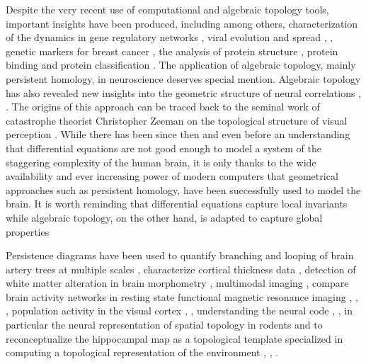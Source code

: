 \documentclass[onecollarge,runningheads]{svjour2}
\begin{document}
Despite the very recent use of computational and algebraic topology tools, important insights have been produced, including among others, characterization of the dynamics in gene regulatory networks \cite{boczko2005structure}, viral evolution and spread \cite{chan2013topology}, \cite{taylor2015topological}, genetic markers for breast cancer \cite{nicolau2011topology}, the analysis of protein structure \cite{xia2014persistent}, protein binding \cite{kovacev2016using} and protein classification \cite{cang2015topological}.
The application of algebraic topology, mainly persistent homology, in neuroscience deserves special mention. Algebraic topology has also revealed new insights into the geometric structure of neural correlations \cite{giusti2015clique}, \cite{dotko2016topological}. The origins of this approach can be traced back to the seminal work of catastrophe theorist Christopher Zeeman on the topological structure of visual perception \cite{zeeman:1962}. While there has been since then and even before an understanding that differential equations are not good enough to model a system of the staggering complexity of the human brain, it is only thanks to the wide availability and ever increasing power of modern computers that geometrical approaches such as persistent homology, have been successfully used to model the brain. It is worth reminding that differential equations capture local invariants while algebraic topology, on the other hand, is adapted to capture global properties \cite{hoffman1966lie}

Persistence diagrams have been used to quantify branching and looping of brain artery trees at multiple scales \cite{bendich2016persistent}, characterize cortical thickness data \cite{chung2009persistence}, detection of white matter alteration in brain morphometry \cite{chung2015persistent}, multimodal imaging \cite{lee2017integrated}, compare brain activity networks in resting state functional magnetic resonance imaging \cite{petri2014homological}, \cite{cassidy2015brain}, \cite{lord2016insights}, population activity in the visual cortex \cite{singh2008topological}, \cite{pirino2015topological}, understanding the neural code \cite{curto2017makes}, \cite{curto2017can}, in particular  the neural representation of spatial topology in rodents \cite{chen2014neural} and to reconceptualize the hippocampal map as a topological template specialized in computing a topological representation of the environment \cite{dabaghian2012topological}, \cite{dabaghian2014reconceiving}, \cite{babichev2016topological}.
\end{document}
